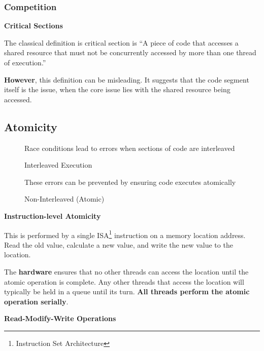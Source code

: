\subsubsection{Competition}
\par {\large \textbf{Critical Sections}}
\par The classical definition is critical section is \enquote{A piece of code that accesses a shared resource that must not be concurrently accessed by more than one thread of execution.}
\par \textbf{However}, this definition can be misleading. It suggests that the code segment itself is the issue, when the core issue lies with
the shared resource being accessed.
%
\clearpage
%
\subsection{Atomicity}
\begin{figure}[h]
    \centering
    \begin{minipage}{0.45\textwidth}
        \par Race conditions lead to errors when sections of code are interleaved\\
        \centering
        \caption{Interleaved Execution}
    \end{minipage}
    \hfill\vrule\hfill
    \begin{minipage}{0.45\textwidth}
        \par These errors can be prevented by ensuring code executes atomically\\
        \centering
        \caption{Non-Interleaved (Atomic)}
    \end{minipage}
    \label{fig:atomicity1}
\end{figure}
\par {\large \textbf{Instruction-level Atomicity}}
\par This is performed by a single ISA\footnote{Instruction Set Architecture} instruction on a memory location address. Read the old value, calculate a new value, and write the new value to the location.
\par The \textbf{hardware} ensures that no other threads can access the location until the atomic operation is complete. Any other threads that access the location will typically be held in a queue until its turn. \textbf{All threads perform the atomic operation serially}.
\par {\large \textbf{Read-Modify-Write Operations}}
